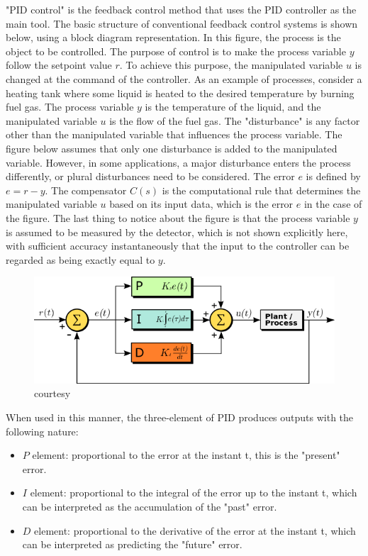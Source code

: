 "PID control" is the feedback control method that uses the PID controller as the main tool. The basic structure of conventional feedback control systems is shown below, using a block diagram representation. In this figure, the process is the object to be controlled. The purpose of control is to make the process variable $y$ follow the setpoint value $r$. To achieve this purpose, the manipulated variable $u$ is changed at the command of the controller. As an example of processes, consider a heating tank where some liquid is heated to the desired temperature by burning fuel gas. The process variable $y$ is the temperature of the liquid, and the manipulated variable $u$ is the flow of the fuel gas. The "disturbance" is any factor other than the manipulated variable that influences the process variable. The figure below assumes that only one disturbance is added to the manipulated variable. However, in some applications, a major disturbance enters the process differently, or plural disturbances need to be considered. The error $e$ is defined by $e=r-y .$ The compensator $C(s)$ is the computational rule that determines the manipulated variable $u$ based on its input data, which is the error $e$ in the case of the figure. The last thing to notice about the figure is that the process variable $y$ is assumed to be measured by the detector, which is not shown explicitly here, with sufficient accuracy instantaneously that the input to the controller can be regarded as being exactly equal to $y$.

\begin{figure}[H]
	\includegraphics[width=\textwidth]{PID_en.svg.png}
	\caption{courtesy}
\end{figure}

When used in this manner, the three-element of PID produces outputs with the 
following nature:
\begin{itemize}
	\item $P$ element: proportional to the error at the instant t, this is the "present" error.
	\item $I$ element: proportional to the integral of the error up to the instant t, which can be interpreted as the accumulation of the "past" error. 
	\item $D$ element: proportional to the derivative of the error at the instant t, which can be interpreted as predicting the "future" error. 
\end{itemize}

